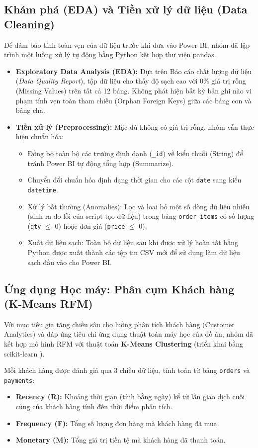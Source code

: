 \subsection{Khám phá (EDA) và Tiền xử lý dữ liệu (Data Cleaning)}
Để đảm bảo tính toàn vẹn của dữ liệu trước khi đưa vào Power BI, nhóm đã lập trình một luồng xử lý tự động bằng Python kết hợp thư viện pandas.
\begin{itemize}
    \item \textbf{Exploratory Data Analysis (EDA):} Dựa trên Báo cáo chất lượng dữ liệu (\textit{Data Quality Report}), tập dữ liệu cho thấy độ sạch cao với 0\% giá trị rỗng (Missing Values) trên tất cả 12 bảng. Không phát hiện bất kỳ bản ghi nào vi phạm tính vẹn toàn tham chiếu (Orphan Foreign Keys) giữa các bảng con và bảng cha.
    \item \textbf{Tiền xử lý (Preprocessing):} Mặc dù không có giá trị rỗng, nhóm vẫn thực hiện chuẩn hóa:
    \begin{itemize}
        \item Đồng bộ toàn bộ các trường định danh (\texttt{\_id}) về kiểu chuỗi (String) để tránh Power BI tự động tổng hợp (Summarize).
        \item Chuyển đổi chuẩn hóa định dạng thời gian cho các cột \texttt{date} sang kiểu \texttt{datetime}.
        \item Xử lý bất thường (Anomalies): Lọc và loại bỏ một số dòng dữ liệu nhiễu (sinh ra do lỗi của script tạo dữ liệu) trong bảng \texttt{order\_items} có số lượng (\texttt{qty} $\le$ 0) hoặc đơn giá (\texttt{price} $\le$ 0). 
        \item Xuất dữ liệu sạch: Toàn bộ dữ liệu sau khi được xử lý hoàn tất bằng Python được xuất thành các tệp tin CSV mới để sử dụng làm dữ liệu sạch đầu vào cho Power BI.
    \end{itemize}
\end{itemize}

\subsection{Ứng dụng Học máy: Phân cụm Khách hàng (K-Means RFM)}
Với mục tiêu gia tăng chiều sâu cho luồng phân tích khách hàng (Customer Analytics) và đáp ứng tiêu chí ứng dụng thuật toán máy học của đồ án, nhóm đã kết hợp mô hình RFM \cite{hughes2007} với thuật toán \textbf{K-Means Clustering} \cite{macqueen1967} (triển khai bằng scikit-learn \cite{sklearn_kmeans}).

Mỗi khách hàng được đánh giá qua 3 chiều dữ liệu, tính toán từ bảng \texttt{orders} và \texttt{payments}:
\begin{itemize}
    \item \textbf{Recency (R):} Khoảng thời gian (tính bằng ngày) kể từ lần giao dịch cuối cùng của khách hàng tính đến thời điểm phân tích.
    \item \textbf{Frequency (F):} Tổng số lượng đơn hàng mà khách hàng đã mua.
    \item \textbf{Monetary (M):} Tổng giá trị tiền tệ mà khách hàng đã thanh toán.
\end{itemize}

